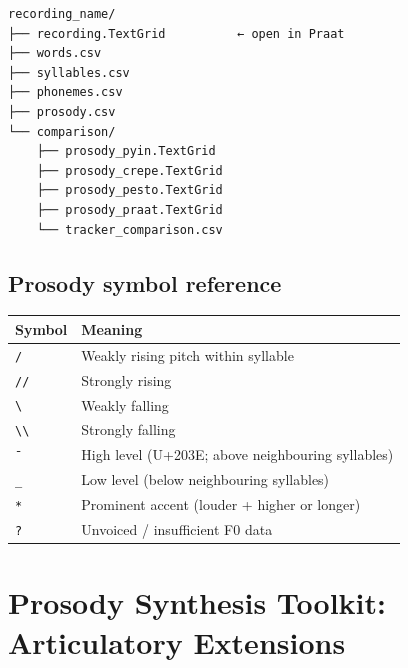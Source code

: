 \begin{verbatim}
recording_name/
├── recording.TextGrid          ← open in Praat
├── words.csv
├── syllables.csv
├── phonemes.csv
├── prosody.csv
└── comparison/
    ├── prosody_pyin.TextGrid
    ├── prosody_crepe.TextGrid
    ├── prosody_pesto.TextGrid
    ├── prosody_praat.TextGrid
    └── tracker_comparison.csv
\end{verbatim}

\section*{Prosody symbol reference}

\begin{center}
\small
\begin{tabular}{ll}
\toprule
Symbol & Meaning \\
\midrule
\texttt{/}  & Weakly rising pitch within syllable \\
\texttt{//} & Strongly rising \\
\texttt{\textbackslash}  & Weakly falling \\
\texttt{\textbackslash\textbackslash} & Strongly falling \\
\texttt{{\={}}} & High level (U+203E; above neighbouring syllables) \\
\texttt{\_} & Low level (below neighbouring syllables) \\
\texttt{*}  & Prominent accent (louder + higher or longer) \\
\texttt{?}  & Unvoiced / insufficient F0 data \\
\bottomrule
\end{tabular}
\end{center}


\chapter{Prosody Synthesis Toolkit: Articulatory Extensions}
\label{app:articulatory}

\begin{center}
\end{center}

